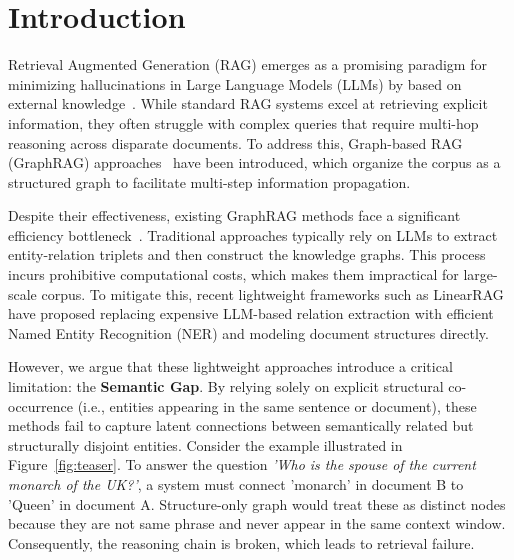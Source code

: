 \section{Introduction}
\label{sec:intro}

Retrieval Augmented Generation (RAG) emerges as a promising paradigm for minimizing hallucinations in Large Language Models (LLMs) by based on external knowledge~\cite{lewis2020retrieval,shuster2021retrieval,ji2023survey,gao2023retrieval,asai2023self,qiu2025efficient,tao2024llms,linghu2025llm}. While standard RAG systems excel at retrieving explicit information, they often struggle with complex queries that require multi-hop reasoning across disparate documents. To address this, Graph-based RAG (GraphRAG) approaches~\cite{edge2024local} have been introduced, which organize the corpus as a structured graph to facilitate multi-step information propagation.

Despite their effectiveness, existing GraphRAG methods face a significant efficiency bottleneck~\cite{han2025rag,peng2024graph}. Traditional approaches typically rely on LLMs to extract entity-relation triplets and then construct the knowledge graphs. This process incurs prohibitive computational costs, which makes them impractical for large-scale corpus. To mitigate this, recent lightweight frameworks such as LinearRAG~\cite{zhuang2025linearrag} have proposed replacing expensive LLM-based relation extraction with efficient Named Entity Recognition (NER) and modeling document structures directly.

However, we argue that these lightweight approaches introduce a critical limitation: the \textbf{Semantic Gap}. By relying solely on explicit structural co-occurrence (i.e., entities appearing in the same sentence or document), these methods fail to capture latent connections between semantically related but structurally disjoint entities. Consider the example illustrated in Figure~\ref{fig:teaser}. To answer the question \textit{'Who is the spouse of the current monarch of the UK?'}, a system must connect 'monarch' in document B to 'Queen' in document A. Structure-only graph would treat these as distinct nodes because they are not same phrase and never appear in the same context window. Consequently, the reasoning chain is broken, which leads to retrieval failure. 

